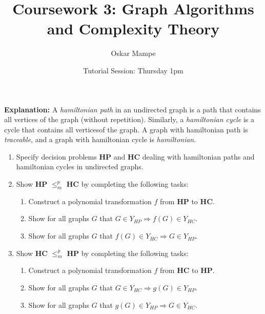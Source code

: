 \documentclass[11pt,a4paper]{article}
\title{Coursework 3: Graph Algorithms and Complexity Theory}
\author{Oskar Mampe}
\date{Tutorial Session: Thursday 1pm}
\begin{document}
\maketitle
\thispagestyle{empty}

\textbf{Explanation: } A \textit{hamiltonian path} in an undirected graph is a path that contains all vertices of the graph (without repetition).  Similarly, a \textit{hamiltonian cycle} is a cycle that contains all verticesof the graph.  A graph with hamiltonian path is \textit{traceable}, and a graph with hamiltonian cycle is \textit{hamiltonian}.

\begin{enumerate}
    \item Specify decision problems \textbf{HP} and \textbf{HC} dealing with hamiltonian paths and hamiltonian cycles in undirected graphs.
    \item Show \textbf{HP} $\leq^p_m$ \textbf{HC} by completing the following tasks: 
        \begin{enumerate}
            \item Construct a polynomial transformation $f$ from \textbf{HP} to \textbf{HC}.
            \item Show for all graphs $G$ that $G \in Y_{HP} \Rightarrow f(G) \in Y_{HC}$. 
            \item Show for all graphs $G$ that $f(G) \in Y_{HC} \Rightarrow G \in Y_{HP}$.
        \end{enumerate}
    \item Show \textbf{HC} $\leq^p_m$ \textbf{HP} by completing the following tasks: 
    \begin{enumerate}
        \item Construct a polynomial transformation $f$ from \textbf{HC} to \textbf{HP}.
        \item Show for all graphs $G$ that $G \in Y_{HC} \Rightarrow g(G) \in Y_{HP}$.
        \item Show for all graphs $G$ that $g(G) \in Y_{HP} \Rightarrow G \in Y_{HC}$.
    \end{enumerate}
\end{enumerate}
\end{document}
